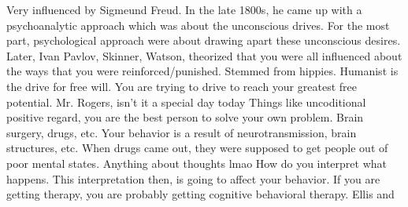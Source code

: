 \markdownRendererInterblockSeparator
{}\markdownRendererInterblockSeparator
{}\markdownRendererUlBeginTight
\markdownRendererUlItem Very influenced by Sigmeund Freud.\markdownRendererUlItemEnd 
\markdownRendererUlItem In the late 1800s, he came up with a psychoanalytic approach which was about the unconscious drives.\markdownRendererUlItemEnd 
\markdownRendererUlItem For the most part, psychological approach were about drawing apart these unconscious desires.\markdownRendererUlItemEnd 
\markdownRendererUlEndTight \markdownRendererInterblockSeparator
{}\markdownRendererInterblockSeparator
{}\markdownRendererUlBeginTight
\markdownRendererUlItem Later, Ivan Pavlov, Skinner, Watson, theorized that you were all influenced about the ways that you were reinforced/punished.\markdownRendererUlItemEnd 
\markdownRendererUlEndTight \markdownRendererInterblockSeparator
{}\markdownRendererInterblockSeparator
{}\markdownRendererUlBeginTight
\markdownRendererUlItem Stemmed from hippies.\markdownRendererUlItemEnd 
\markdownRendererUlItem Humanist is the drive for free will.\markdownRendererUlItemEnd 
\markdownRendererUlItem You are trying to drive to reach your greatest free potential.\markdownRendererUlItemEnd 
\markdownRendererUlEndTight \markdownRendererInterblockSeparator
{}\markdownRendererBlockQuoteBegin
Mr. Rogers, isn't it a special day today
\markdownRendererBlockQuoteEnd \markdownRendererInterblockSeparator
{}\markdownRendererUlBeginTight
\markdownRendererUlItem Things like uncoditional positive regard, you are the best person to solve your own problem.\markdownRendererUlItemEnd 
\markdownRendererUlEndTight \markdownRendererInterblockSeparator
{}\markdownRendererInterblockSeparator
{}\markdownRendererUlBeginTight
\markdownRendererUlItem Brain surgery, drugs, etc.\markdownRendererUlItemEnd 
\markdownRendererUlItem Your behavior is a result of neurotransmission, brain structures, etc.\markdownRendererUlItemEnd 
\markdownRendererUlItem When drugs came out, they were supposed to get people out of poor mental states.\markdownRendererUlItemEnd 
\markdownRendererUlEndTight \markdownRendererInterblockSeparator
{}\markdownRendererInterblockSeparator
{}\markdownRendererUlBeginTight
\markdownRendererUlItem Anything about thoughts lmao\markdownRendererUlItemEnd 
\markdownRendererUlItem How do you interpret what happens.\markdownRendererUlItemEnd 
\markdownRendererUlItem This interpretation then, is going to affect your behavior. If you are getting therapy, you are probably getting cognitive behavioral therapy.\markdownRendererUlItemEnd 
\markdownRendererUlItem Ellis and\markdownRendererUlItemEnd 
\markdownRendererUlEndTight \relax